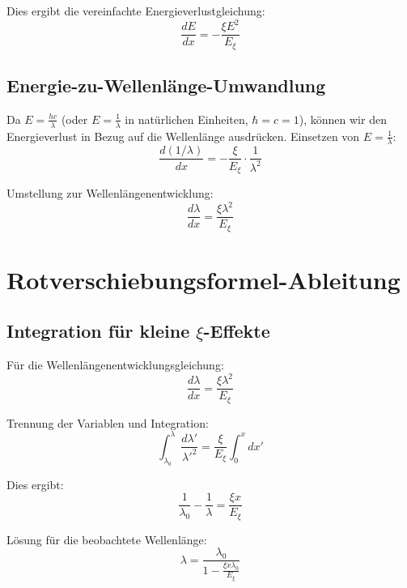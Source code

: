 \documentclass[12pt,a4paper]{article}
\newcommand{\Exi}{E_\xi}
\newcommand{\lambdazero}{\lambda_0}
\theoremstyle{definition}
\begin{document}
	Dies ergibt die vereinfachte Energieverlustgleichung:
	\begin{equation}
		\frac{dE}{dx} = -\frac{\xi E^2}{\Exi}
	\end{equation}
	
	\subsection{Energie-zu-Wellenl\"ange-Umwandlung}
	
	Da $E = \frac{hc}{\lambda}$ (oder $E = \frac{1}{\lambda}$ in nat\"urlichen Einheiten, $\hbar = c = 1$), k\"onnen wir den Energieverlust in Bezug auf die Wellenl\"ange ausdr\"ucken. Einsetzen von $E = \frac{1}{\lambda}$:
	\begin{equation}
		\frac{d(1/\lambda)}{dx} = -\frac{\xi}{\Exi} \cdot \frac{1}{\lambda^2}
	\end{equation}
	
	Umstellung zur Wellenl\"angenentwicklung:
	\begin{equation}
		\frac{d\lambda}{dx} = \frac{\xi \lambda^2}{\Exi}
	\end{equation}
	
	\section{Rotverschiebungsformel-Ableitung}
	
	\subsection{Integration f\"ur kleine $\xi$-Effekte}
	
	F\"ur die Wellenl\"angenentwicklungsgleichung:
	\begin{equation}
		\frac{d\lambda}{dx} = \frac{\xi \lambda^2}{\Exi}
	\end{equation}
	
	Trennung der Variablen und Integration:
	\begin{equation}
		\int_{\lambdazero}^{\lambda} \frac{d\lambda'}{\lambda'^2} = \frac{\xi}{\Exi} \int_0^x dx'
	\end{equation}
	
	Dies ergibt:
	\begin{equation}
		\frac{1}{\lambdazero} - \frac{1}{\lambda} = \frac{\xi x}{\Exi}
	\end{equation}
	
	L\"osung f\"ur die beobachtete Wellenl\"ange:
	\begin{equation}
		\lambda = \frac{\lambdazero}{1 - \frac{\xi x \lambdazero}{\Exi}}
	\end{equation}
	
\end{document}
